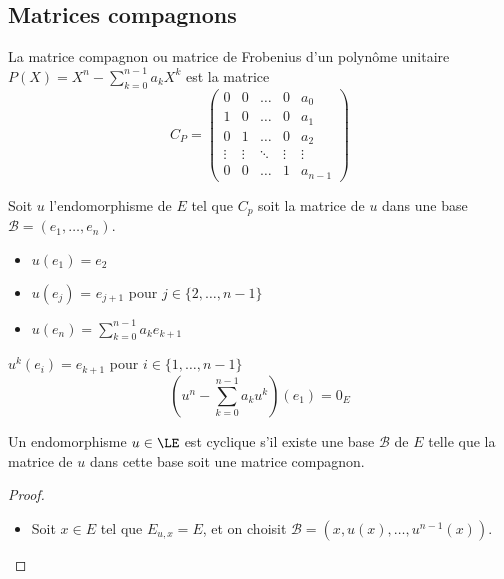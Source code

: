 \subsection{Matrices compagnons}



\begin{definition}
	La matrice compagnon ou matrice de Frobenius d'un polynôme unitaire $P(X)  = X^n - \sum_{k=0}^{n-1} a_k X^k$ est la matrice
	$$ C_P = \begin{pmatrix}
			0      & 0      & \ldots & 0      & a_0     \\
			1      & 0      & \ldots & 0      & a_1     \\
			0      & 1      & \ldots & 0      & a_2     \\
			\vdots & \vdots & \ddots & \vdots & \vdots  \\
			0      & 0      & \ldots & 1      & a_{n-1}
		\end{pmatrix}$$
\end{definition}

\begin{remarque}
	Soit $u$ l'endomorphisme de $E$ tel que $C_p$ soit la matrice de $u$ dans une base $\mathcal{B} = (e_1, \ldots, e_n)$.
	\begin{itemize}
		\item $u(e_1) = e_2$
		\item $u(e_j)$ = $e_{j+1}$ pour $j \in \{2, \ldots, n-1\}$
		\item $u(e_n) = \sum_{k=0}^{n-1} a_k e_{k+1}$
	\end{itemize}


	$u^k(e_i) = e_{k+1}$ pour $i \in \{1, \ldots, n-1\}$
	$$ (u^n - \sum_{k=0}^{n-1} a_k u^k)(e_1) = 0_E$$
\end{remarque}

\begin{remarque}
	Un endomorphisme $u \in \LE$ est cyclique s'il existe une base $\mathcal{B}$ de $E$ telle que la matrice
	de $u$ dans cette base soit une matrice compagnon.
\end{remarque}

\begin{proof}
	\begin{itemize}
		\item Soit $x \in E$ tel que $E_{u,x} = E$, et on choisit $\mathcal{B} = (x, u(x), \dots, u^{n-1}(x))$.
	\end{itemize}
\end{proof}

